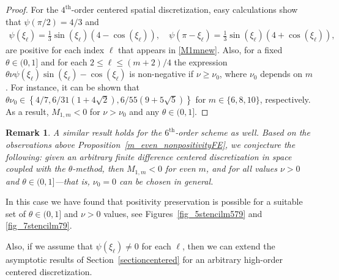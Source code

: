 \documentclass[a4paper]{article}
\newtheorem{remark}{Remark}
\begin{document}
\begin{description}[style=unboxed,leftmargin=0cm]
\begin{proof}
	For the $4^\text{th}$-order centered spatial discretization, easy calculations show that $\psi(\pi/2) = 4/3$
	and
	\begin{align*}
		\psi(\xi_\ell) = \frac{1}{3}\sin(\xi_\ell)(4 - \cos(\xi_\ell)), \quad
		\psi(\pi - \xi_\ell) = \frac{1}{3}\sin(\xi_\ell)(4 + \cos(\xi_\ell)),
	\end{align*}
	are positive for each index $\ell$ that appears in \eqref{M1mnew}.
	Also, for a fixed $\theta \in (0,1]$ and for each $2 \le \ell \le (m+2)/4$ the expression
	$\theta\nu\psi(\xi_\ell)\sin(\xi_\ell)-\cos(\xi_\ell)$ is non-negative if $\nu \ge \nu_0$, where $\nu_0$
	depends on $m$.
	For instance, it can be shown that
	$\theta\nu_0 \in \left\{4/7, 6/31(1 + 4 \sqrt{2}), 6/55(9 + 5 \sqrt{5})\right\}$ for $m \in \{6,8,10\}$,
	respectively.
	As a result, $M_{1,m} < 0$ for $\nu > \nu_0$ and any $\theta \in (0,1]$.
\end{proof}
\begin{remark}
	A similar result holds for the $6^\text{th}$-order scheme as well.
	Based on the observations above Proposition~\ref{m_even_nonpositivityFE}, we conjecture the following:
	given an arbitrary finite difference centered discretization in space coupled with the $\theta$-method, then
	$M_{1,m} < 0$ for even $m$, and for all values $\nu > 0$ and $\theta \in (0,1]$---that is, $\nu_0=0$ can be chosen in general.
\end{remark}
\item [{Case 2:} $m$ is {odd}.] In this case we have found that positivity preservation is possible for a suitable
set of $\theta\in(0,1]$ and $\nu>0$ values, see  Figures~\ref{fig_5stencilm579} and \ref{fig_7stencilm79}.

Also, if we assume that $\psi(\xi_\ell) \ne 0$ for each $\ell$, then we can extend the asymptotic results of
Section~\ref{sectioncentered} for an arbitrary high-order centered discretization.
\end{description}
\end{document}
